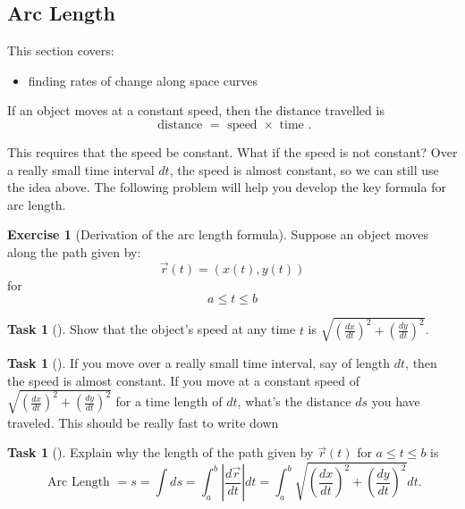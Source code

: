 \documentclass[10pt,]{book}
\theoremstyle{plain}
\theoremstyle{definition}
\theoremstyle{definition}
\theoremstyle{definition}
\theoremstyle{definition}
\newtheorem{exploration}[project]{Exercise}
\newtheorem{task}[project]{Task}
\theoremstyle{definition}
\numberwithin{equation}{section}
\newcommand{\ds}{\displaystyle}
\begin{document}
\subsection[{Arc Length}]{Arc Length}\label{arc_length}
This section covers: \leavevmode%
\begin{itemize}[label=\textbullet]
\item{}finding rates of change along space curves%
\end{itemize}
%
\par
If an object moves at a constant speed, then the distance travelled is%
\begin{equation*}
\text{ distance }  = \text{ speed } \times\text{ time } .
\end{equation*}
%
\par
This requires that the speed be constant. What if the speed is not constant? Over a really small time interval \(dt\), the speed is almost constant, so we can still use the idea above. The following problem will help you develop the key formula for arc length.%
\begin{exploration}[Derivation of the arc length formula]\label{exploration-80}
Suppose an object moves along the path given by:%
\begin{equation*}
\vec r(t)=(x(t),y(t))
\end{equation*}
for%
\begin{equation*}
a\leq t\leq b
\end{equation*}
%
\begin{task}[]\label{task-132}
Show that the object's speed at any time \(t\) is \(\ds\sqrt{\left(\frac{dx}{dt}\right)^2+\left(\frac{dy}{dt}\right)^2}\).%
\end{task}
\begin{task}[]\label{task-133}
If you move over a really small time interval, say of length \(dt\), then the speed is almost constant. If you move at a constant speed of \(\ds\sqrt{\left(\frac{dx}{dt}\right)^2+\left(\frac{dy}{dt}\right)^2}\) for a time length of \(dt\), what's the distance \(ds\) you have traveled. This should be really fast to write down%
%
\end{task}
\begin{task}[]\label{arc_length_formula}
Explain why the length of the path given by \(\vec r(t)\) for \(a\leq t\leq b\) is   %
\begin{equation*}
\text{ Arc Length } =s=\int ds=\int_a^b \left|\frac{d\vec r}{dt}\right| dt=\int_a^b \sqrt{\left(\frac{dx}{dt}\right)^2+\left(\frac{dy}{dt}\right)^2}dt.
\end{equation*}
%
\end{task}
\end{exploration}
\end{document}
